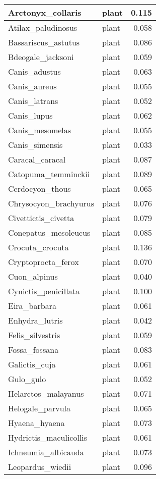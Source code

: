 \begin{table}
\begin{tabular}[t]{l|l|r}
\hline
Arctonyx\_collaris & plant & 0.115\\
\hline
Atilax\_paludinosus & plant & 0.058\\
\hline
Bassariscus\_astutus & plant & 0.086\\
\hline
Bdeogale\_jacksoni & plant & 0.059\\
\hline
Canis\_adustus & plant & 0.063\\
\hline
Canis\_aureus & plant & 0.055\\
\hline
Canis\_latrans & plant & 0.052\\
\hline
Canis\_lupus & plant & 0.062\\
\hline
Canis\_mesomelas & plant & 0.055\\
\hline
Canis\_simensis & plant & 0.033\\
\hline
Caracal\_caracal & plant & 0.087\\
\hline
Catopuma\_temminckii & plant & 0.089\\
\hline
Cerdocyon\_thous & plant & 0.065\\
\hline
Chrysocyon\_brachyurus & plant & 0.076\\
\hline
Civettictis\_civetta & plant & 0.079\\
\hline
Conepatus\_mesoleucus & plant & 0.085\\
\hline
Crocuta\_crocuta & plant & 0.136\\
\hline
Cryptoprocta\_ferox & plant & 0.070\\
\hline
Cuon\_alpinus & plant & 0.040\\
\hline
Cynictis\_penicillata & plant & 0.100\\
\hline
Eira\_barbara & plant & 0.061\\
\hline
Enhydra\_lutris & plant & 0.042\\
\hline
Felis\_silvestris & plant & 0.059\\
\hline
Fossa\_fossana & plant & 0.083\\
\hline
Galictis\_cuja & plant & 0.061\\
\hline
Gulo\_gulo & plant & 0.052\\
\hline
Helarctos\_malayanus & plant & 0.071\\
\hline
Helogale\_parvula & plant & 0.065\\
\hline
Hyaena\_hyaena & plant & 0.073\\
\hline
Hydrictis\_maculicollis & plant & 0.061\\
\hline
Ichneumia\_albicauda & plant & 0.073\\
\hline
Leopardus\_wiedii & plant & 0.096\\

\end{tabular}
\end{table}

